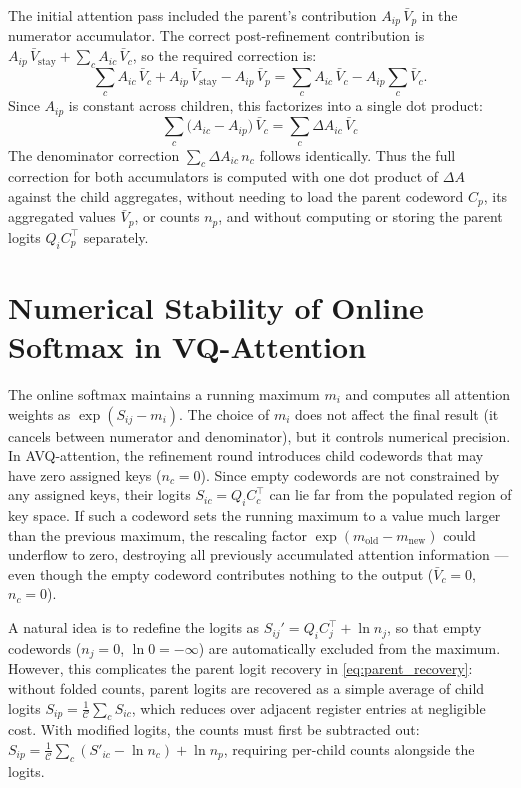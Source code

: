 The initial attention pass included the parent's contribution $A_{ip}\, \bar{V}_p$ in the numerator accumulator. The correct post-refinement contribution is $A_{ip}\, \bar{V}_{\text{stay}} + \sum_c A_{ic}\, \bar{V}_c$, so the required correction is:
\begin{equation}
\sum_c A_{ic}\, \bar{V}_c + A_{ip}\, \bar{V}_{\text{stay}} - A_{ip}\, \bar{V}_p = \sum_c A_{ic}\, \bar{V}_c - A_{ip} \sum_c \bar{V}_c.
\end{equation}
Since $A_{ip}$ is constant across children, this factorizes into a single dot product:
\begin{equation}
\label{eq:correction_factorization}
\sum_c \big(A_{ic} - A_{ip}\big)\, \bar{V}_c = \sum_c \Delta A_{ic}\, \bar{V}_c
\end{equation}
The denominator correction $\sum_c \Delta A_{ic}\, n_c$ follows identically. Thus the full correction for both accumulators is computed with one dot product of $\Delta A$ against the child aggregates, without needing to load the parent codeword $C_p$, its aggregated values $\bar{V}_p$, or counts $n_p$, and without computing or storing the parent logits $Q_i C_p^\top$ separately.

\section{Numerical Stability of Online Softmax in VQ-Attention}
\label{app:effective_logits}

The online softmax maintains a running maximum $m_i$ and computes all attention weights as $\exp(S_{ij} - m_i)$. The choice of $m_i$ does not affect the final result (it cancels between numerator and denominator), but it controls numerical precision. In AVQ-attention, the refinement round introduces child codewords that may have zero assigned keys ($n_c = 0$). Since empty codewords are not constrained by any assigned keys, their logits $S_{ic} = Q_i C_c^\top$ can lie far from the populated region of key space. If such a codeword sets the running maximum to a value much larger than the previous maximum, the rescaling factor $\exp(m_{\text{old}} - m_{\text{new}})$ could underflow to zero, destroying all previously accumulated attention information --- even though the empty codeword contributes nothing to the output ($\bar{V}_c = 0$, $n_c = 0$).

A natural idea is to redefine the logits as $S_{ij}' = Q_i C_j^\top + \ln n_j$, so that empty codewords ($n_j = 0$, $\ln 0 = -\infty$) are automatically excluded from the maximum. However, this complicates the parent logit recovery in \cref{eq:parent_recovery}: without folded counts, parent logits are recovered as a simple average of child logits $S_{ip} = \frac{1}{\mathcal{C}}\sum_c S_{ic}$, which reduces over adjacent register entries at negligible cost. With modified logits, the counts must first be subtracted out: $S_{ip} = \frac{1}{\mathcal{C}}\sum_c (S'_{ic} - \ln n_c) + \ln n_p$, requiring per-child counts alongside the logits.

